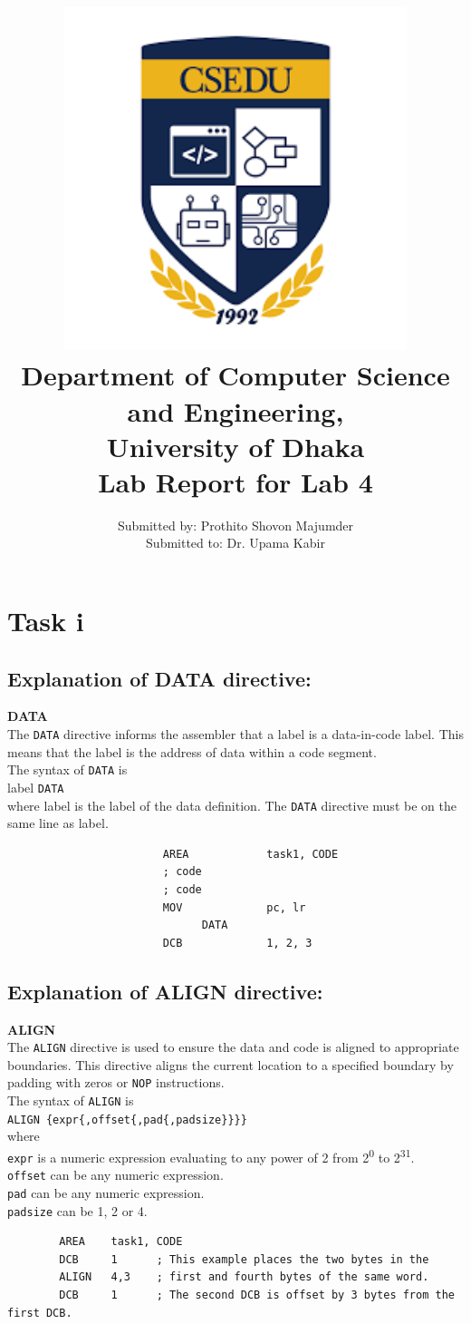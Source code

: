 \documentclass[12pt]{article}
\title{
{\includegraphics[width=12cm, height=10cm]{images/csedu_logo.png}}\\
{\large Department of Computer Science and Engineering,\\      University of Dhaka}\\
{ Lab Report for Lab 4 }
}
\author{ Submitted by: Prothito Shovon Majumder \\ Submitted to: Dr. Upama Kabir }
\begin{document}
\maketitle

\newpage
\section{Task i}

\subsection{Explanation of DATA directive:}
\textbf{DATA}\\
The \verb|DATA| directive informs the assembler that a label is a data-in-code label. This means that the label is the address of data within a code segment.\\
The syntax of \verb|DATA| is\\
\textup{label} \verb|DATA|\\
where \textup{label} is the label of the data definition. The \verb|DATA| directive must be on the same line as \textup{label}.
\begin{lstlisting}
                        AREA            task1, CODE
                        ; code
                        ; code
                        MOV             pc, lr
                              DATA
                        DCB             1, 2, 3
\end{lstlisting}
\subsection{Explanation of ALIGN directive:}
\textbf{ALIGN}\\
The \verb|ALIGN| directive is used to ensure the data and code is aligned to appropriate boundaries. This directive aligns the current location to a specified boundary by padding with zeros or \verb|NOP| instructions.\\
The syntax of \verb|ALIGN| is\\
\verb|ALIGN {expr{,offset{,pad{,padsize}}}}|\\
where \\
\verb|expr| is a numeric expression evaluating to any power of 2 from 2\textsuperscript{0} to 2\textsuperscript{31}.\\
\verb|offset| can be any numeric expression.\\
\verb|pad| can be any numeric expression.\\
\verb|padsize| can be 1, 2 or 4.
\begin{lstlisting}
        AREA    task1, CODE
        DCB     1      ; This example places the two bytes in the 
        ALIGN   4,3    ; first and fourth bytes of the same word.
        DCB     1      ; The second DCB is offset by 3 bytes from the first DCB.                        
\end{lstlisting}
\pagebreak
\end{document}
